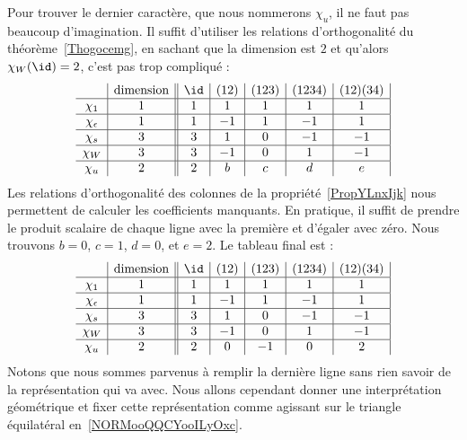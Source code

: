 Pour trouver le dernier caractère, que nous nommerons \( \chi_u\), il ne faut pas beaucoup d'imagination. Il suffit d'utiliser les relations d'orthogonalité du théorème~\ref{Thogocemg}, en sachant que la dimension est \( 2\) et qu'alors \( \chi_W(\id)=2\), c'est pas trop compliqué :
\begin{equation}    \label{EqOKtZYFQ}
    \begin{array}[]{c|c||c|c|c|c|c|}
        &\text{dimension}&\id&(12)&(123)&(1234)&(12)(34)\\
          \hline
          \chi_1&1&1&1&1&1&1\\
          \hline
          \chi_{\epsilon}&1&1&-1&1&-1&1\\
          \hline
          \chi_s&3&3&1&0&-1&-1\\
          \hline
          \chi_W&3&3&-1&0&1&-1\\
          \hline
          \chi_u&2&2&b&c&d&e\\
    \end{array}
\end{equation}
Les relations d'orthogonalité des colonnes de la propriété~\ref{PropYLnxIjk} nous permettent de calculer les coefficients manquants. En pratique, il suffit de prendre le produit scalaire de chaque ligne avec la première et d'égaler avec zéro. Nous trouvons \( b=0\), \( c=1\), \( d=0\), et \( e=2\). Le tableau final est :
\begin{equation}
    \begin{array}[]{c|c||c|c|c|c|c|}
        &\text{dimension}&\id&(12)&(123)&(1234)&(12)(34)\\
          \hline
          \chi_1&1&1&1&1&1&1\\
          \hline
          \chi_{\epsilon}&1&1&-1&1&-1&1\\
          \hline
          \chi_s&3&3&1&0&-1&-1\\
          \hline
          \chi_W&3&3&-1&0&1&-1\\
          \hline
          \chi_u&2&2&0&-1&0&2\\
    \end{array}
\end{equation}
Notons que nous sommes parvenus à remplir la dernière ligne sans rien savoir de la représentation qui va avec. Nous allons cependant donner une interprétation géométrique et fixer cette représentation comme agissant sur le triangle équilatéral en~\ref{NORMooQQCYooILyOxc}.


